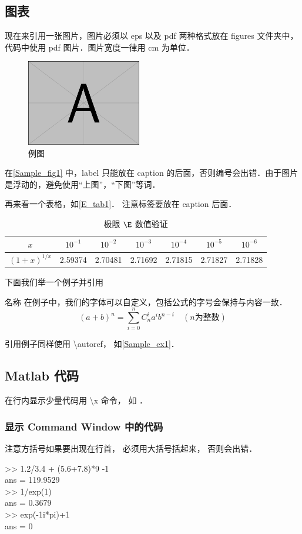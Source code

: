 \subsection{图表}

现在来引用一张图片，图片必须以 eps 以及 pdf 两种格式放在 figures 文件夹中，代码中使用 pdf 图片．图片宽度一律用 cm 为单位．
\begin{figure}[ht]
\centering
\includegraphics[width=5cm]{./figures/Sample.pdf}
\caption{例图} \label{Sample_fig1}
\end{figure}
在\autoref{Sample_fig1} 中，label 只能放在 caption 的后面，否则编号会出错．由于图片是浮动的，避免使用“上图”，“下图”等词．

再来看一个表格，如\autoref{E_tab1}． 注意标签要放在 caption 后面．
\begin{table}[ht]
\centering
\caption{极限 $\E$ 数值验证}\label{E_tab1}
\begin{tabular}{|c|c|c|c|c|c|c|}
\hline
$x$ & ${10^{ - 1}}$ & ${10^{ - 2}}$ & ${10^{ - 3}}$ & ${10^{ - 4}}$ & ${10^{ - 5}}$ & ${10^{ - 6}}$ \\
\hline
$(1 + x)^{1/x}$ & 2.59374 & 2.70481 & 2.71692 & 2.71815 & 2.71827 & 2.71828 \\
\hline
\end{tabular}
\end{table}

下面我们举一个例子并引用

\begin{exam}{名称}\label{Sample_ex1}
在例子中，我们的字体可以自定义，包括公式的字号会保持与内容一致．
\begin{equation}
(a+b)^n = \sum_{i=0}^n C_n^i a^i b^{n-i} \quad (n\text{为整数})
\end{equation}
\end{exam}
引用例子同样使用 \textbackslash autoref， 如\autoref{Sample_ex1}． 

\subsection{Matlab 代码}
在行内显示少量代码用 \textbackslash x 命令， 如 ．
\subsubsection{显示  Command Window 中的代码}
注意方括号如果要出现在行首， 必须用大括号括起来， 否则会出错．
\begin{Command}
>> 1.2/3.4 + (5.6+7.8)*9 -1 \\
ans = 119.9529 \\
>> 1/exp(1) \\
ans = 0.3679 \\
>> exp(-1i*pi)+1 \\
ans = 0
\end{Command}

